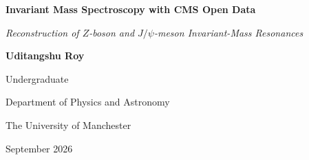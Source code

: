 \documentclass[11pt, a4paper]{article}
\numberwithin{equation}{section}
\begin{document}
\begin{titlepage}
    \begin{center}
    
    \vspace*{2cm} %

    {\Huge\bfseries Invariant Mass Spectroscopy with CMS Open Data \par}
    \vspace{0.4cm}
    
    {\Large\itshape Reconstruction of $Z$-boson and $J/\psi$-meson Invariant-Mass Resonances \par}
    
    \vspace{2.5cm} %
    
    {\large\bfseries Uditangshu Roy \par}
    \vspace{0.2cm}
    {\large Undergraduate \par}
    \vspace{0.2cm}
    {Department of Physics and Astronomy\par}
    \vspace{0.2cm} 
    {The University of Manchester \par}
    
    \vspace{2.5cm} %
    
    {\large September 2026 \par}
    
    \vfill

    \end{center}
    


\end{titlepage}
\end{document}
